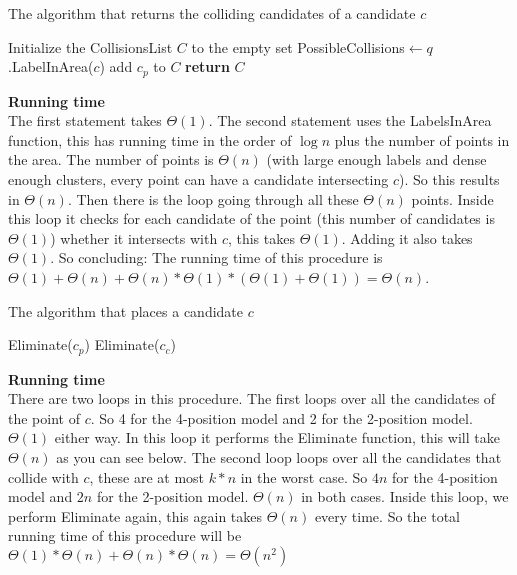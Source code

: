 \documentclass[crop=false,a4paper,oneside,11pt]{article}
\begin{document}
\begin{algorithm}[H]
\caption{The algorithm that returns the colliding candidates of a candidate $c$}
\begin{algorithmic}[1]
\State Initialize the CollisionsList $C$ to the empty set
\State PossibleCollisions$\gets q$.LabelInArea($c$)
\State add $c_p$ to $C$
\EndIf
\EndFor
\EndFor
\State \textbf{return} $C$
\EndProcedure
\end{algorithmic}
\end{algorithm}
\textbf{Running time}\\
The first statement takes $\Theta(1)$. The second statement uses the LabelsInArea function, this has running time in the order of $\log n$ plus the number of points in the area. The number of points is $\Theta(n)$ (with large enough labels and dense enough clusters, every point can have a candidate intersecting $c$). So this results in $\Theta(n)$. Then there is the loop going through all these $\Theta(n)$ points. Inside this loop it checks for each candidate of the point (this number of candidates is $\Theta(1)$) whether it intersects with $c$, this takes $\Theta(1)$. Adding it also takes $\Theta(1)$. So concluding: The running time of this procedure is $\Theta(1)+\Theta(n)+\Theta(n)*\Theta(1)*(\Theta(1)+\Theta(1))=\Theta(n)$.

\begin{algorithm}[H]
\caption{The algorithm that places a candidate $c$}
\begin{algorithmic}[1]
\State Eliminate($c_p$)
\EndFor
{}
\State Eliminate($c_c$)
\EndFor
\EndProcedure
\end{algorithmic}
\end{algorithm}
\textbf{Running time}\\
There are two loops in this procedure. The first loops over all the candidates of the point of $c$. So 4 for the 4-position model and 2 for the 2-position model. $\Theta(1)$ either way. In this loop it performs the Eliminate function, this will take $\Theta(n)$ as you can see below. The second loop loops over all the candidates that collide with $c$, these are at most $k*n$ in the worst case. So $4n$ for the 4-position model and $2n$ for the 2-position model. $\Theta(n)$ in both cases. Inside this loop, we perform Eliminate again, this again takes $\Theta(n)$ every time. So the total running time of this procedure will be $\Theta(1)*\Theta(n)+\Theta(n)*\Theta(n)=\Theta(n^2)$
\end{document}
